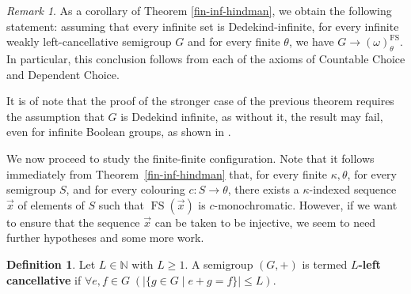 \documentclass[10pt,a4paper]{amsart}
\theoremstyle{definition}
\newtheorem{definition}[theorem]{Definition}
\theoremstyle{remark}
\newtheorem{remark}[theorem]{Remark}
\numberwithin{equation}{section}
\begin{document}
\begin{remark}
    As a corollary of Theorem \ref{fin-inf-hindman}, we obtain the following statement: assuming that every infinite set is Dedekind-infinite, for every infinite weakly left-cancellative semigroup $G$ and for every finite $\theta$, we have $G \to (\omega)_\theta^{\operatorname{FS}}$. In particular, this conclusion follows from each of the axioms of Countable Choice and Dependent Choice.
\end{remark}

It is of note that the proof of the stronger case of the previous theorem requires the assumption that $G$ is Dedekind infinite, as without it, the result may fail, even for infinite Boolean groups, as shown in \cite[Theorem 5.2]{Fernandez2024}.

We now proceed to study the finite-finite configuration. Note that it follows immediately from Theorem~\ref{fin-inf-hindman} that, for every finite $\kappa,\theta$, for every semigroup $S$, and for every colouring $c:S\longrightarrow\theta$, there exists a $\kappa$-indexed sequence $\vec{x}$ of elements of $S$ such that $\operatorname{FS}(\vec{x})$ is $c$-monochromatic. However, if we want to ensure that the sequence $\vec{x}$ can be taken to be injective, we seem to need further hypotheses and some more work.

\begin{definition}
    Let $L\in\mathbb{N}$ with $L\geq1$. A semigroup $(G, +)$ is termed \textbf{$L$-left cancellative} if $\forall e, f\in G\;(|\{g\in G\mid e+g=f\}|\leq L)$.
\end{definition}
\end{document}
